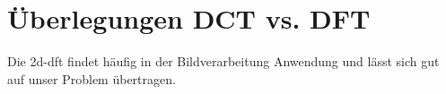  \section{Überlegungen DCT vs. DFT}
 Die \gls{2d-dft} findet häufig in der Bildverarbeitung Anwendung und lässt sich gut auf unser Problem übertragen.